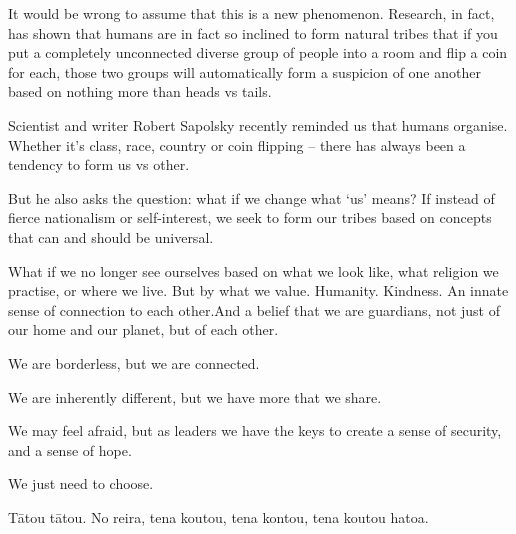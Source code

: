 \documentclass[10pt,a4paper]{article}
\begin{document}
It would be wrong to assume that this is a new phenomenon. Research, in fact, has shown that humans are in fact so inclined to form natural tribes that if you put a completely unconnected diverse group of people into a room and flip a coin for each, those two groups will automatically form a suspicion of one another based on nothing more than heads vs tails.

Scientist and writer Robert Sapolsky recently reminded us that humans organise. Whether it’s class, race, country or coin flipping – there has always been a tendency to form us vs other.

But he also asks the question: what if we change what ‘us’ means? If instead of fierce nationalism or self-interest, we seek to form our tribes based on concepts that can and should be universal.

What if we no longer see ourselves based on what we look like, what religion we practise, or where we live. But by what we value. Humanity. Kindness. An innate sense of connection to each other.And a belief that we are guardians, not just of our home and our planet, but of each other.

We are borderless, but we are connected.

We are inherently different, but we have more that we share.

We may feel afraid, but as leaders we have the keys to create a sense of security, and a sense of hope.

We just need to choose.

Tātou tātou. No reira, tena koutou, tena kontou, tena koutou hatoa.
\end{document}
